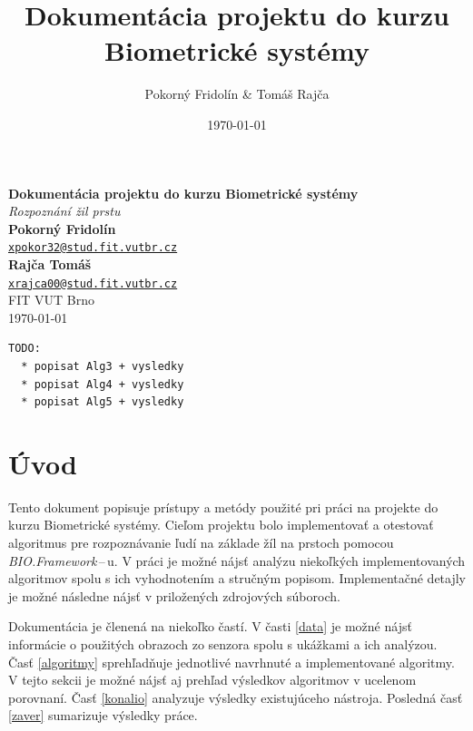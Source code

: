 \documentclass[11pt,a4paper]{article}
\begin{document}
\title{Dokumentácia projektu do kurzu Biometrické systémy}
\author{Pokorný Fridolín \& Tomáš Rajča}
\date{\today}

\vspace*{\fill}
\begin{center}
\textbf{\Huge\textbf{Dokumentácia projektu do kurzu Biometrické systémy}} \\
\vspace{8mm}
\textit{\Large\color{gray} Rozpoznání žil prstu}\\
\vspace*{\fill}
\vspace*{\fill}
\hfill\textbf{Pokorný Fridolín} \\
\hfill{\href{mailto:xpokor32@stud.fit.vutbr.cz}{\nolinkurl{xpokor32@stud.fit.vutbr.cz}}} \\
\hfill\textbf{Rajča Tomáš} \\
\hfill{\href{mailto:xrajca00@stud.fit.vutbr.cz}{\nolinkurl{xrajca00@stud.fit.vutbr.cz}}} \\
\hfill{FIT VUT Brno} \\
\hfill\today
\end{center}
\vspace*{\fill}

\renewcommand{\baselinestretch}{1.5}
\thispagestyle{empty}
\clearpage

\begin{verbatim}
TODO:
  * popisat Alg3 + vysledky
  * popisat Alg4 + vysledky
  * popisat Alg5 + vysledky
\end{verbatim}

\setcounter{page}{1}
\clearpage

\section{Úvod} \label{uvod}

Tento dokument popisuje prístupy a metódy použité pri práci na projekte do kurzu
Biometrické systémy. Cieľom projektu bolo implementovať a otestovať algoritmus
pre rozpoznávanie ľudí na základe žíl na prstoch pomocou
\emph{BIO.Framework}\,--\,u. V práci je možné nájsť analýzu niekoľkých
implementovaných algoritmov spolu s ich vyhodnotením a stručným popisom.
Implementačné detajly je možné následne nájsť v priložených zdrojových súboroch.

Dokumentácia je členená na niekoľko častí. V časti \ref{data} je možné nájsť
informácie o použitých obrazoch zo senzora spolu s ukážkami a ich analýzou. Časť
\ref{algoritmy} sprehľadňuje jednotlivé navrhnuté a implementované algoritmy.
V tejto sekcii je možné nájsť aj prehľad výsledkov algoritmov v ucelenom
porovnaní. Časť \ref{konalio} analyzuje výsledky existujúceho nástroja. Posledná
časť \ref{zaver} sumarizuje výsledky práce.
\end{document}
